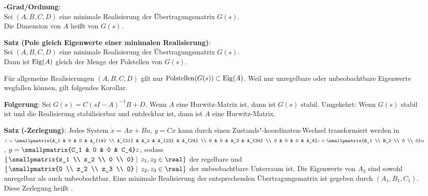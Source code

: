 \linie

\textbf{-Grad/Ordnung}:\\
Sei $(A, B, C, D)$ eine minimale Realisierung der Übertragungsmatrix $G(s)$.\\
Die Dimension von $A$ heißt  von $G(s)$.

\textbf{Satz (Pole gleich Eigenwerte einer minimalen Realisierung)}:\\
Sei $(A, B, C, D)$ eine minimale Realisierung der Übertragungsmatrix $G(s)$.\\
Dann ist $\operatorname{Eig}(A)$ gleich der Menge der Polstellen von $G(s)$.

Für allgemeine Realisierungen $(A, B, C, D)$ gilt nur $\text{Polstellen}(G(s)) \subset \operatorname{Eig}(A)$.
Weil nur unregelbare oder unbeobachtbare Eigenwerte wegfallen können, gilt folgendes Korollar.

\textbf{Folgerung}:
Sei $G(s) = C(sI - A)^{-1} B + D$.
Wenn $A$ eine Hurwitz-Matrix ist, dann ist $G(s)$ stabil.
Umgekehrt:
Wenn $G(s)$ stabil ist und die Realisierung stabilisierbar und entdeckbar ist,
dann ist $A$ eine Hurwitz-Matrix.

\linie

\textbf{Satz (-Zerlegung)}:
Jedes System $\dot{x} = Ax + Bu$, $y = Cx$ kann durch einen Zustands"-koordinaten-Wechsel
transformiert werden in\\
$\dot{z} = \smallpmatrix{A_1 & 0 & 0 & A_{14} \\ A_{21} & A_2 & A_{23} & A_{24} \\
0 & 0 & A_3 & A_{34} \\ 0 & 0 & 0 & A_4} z + \smallpmatrix{B_1 \\ B_2 \\ 0 \\ 0} u$,
$y = \smallpmatrix{C_1 & 0 & 0 & C_4} z$,
sodass\\
$\left\{\left.\smallpmatrix{z_1 \\ z_2 \\ 0 \\ 0} \;\right|\; z_1, z_2 \in \real\right\}$
der regelbare und
$\left\{\left.\smallpmatrix{0 \\ z_2 \\ z_3 \\ 0} \;\right|\; z_2, z_3 \in \real\right\}$
der unbeobachtbare Unterraum ist.
Die Eigenwerte von $A_3$ sind sowohl unregelbar als auch unbeobachtbar.
Eine minimale Realisierung der entsprechenden Übertragungsmatrix ist gegeben durch
$(A_1, B_1, C_1)$.
Diese Zerlegung heißt .

